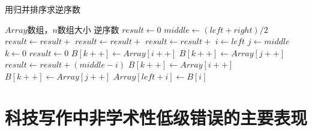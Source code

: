 \documentclass{cqupt_thesis}
\begin{document}
    \begin{algorithm}[H]

        \label{用归并排序求逆序数}
        \caption{用归并排序求逆序数}
        \begin{algorithmic}[1] %
            \Require $Array$数组，$n$数组大小
            \Ensure 逆序数
                \State $result \gets 0$
                    \State $middle \gets (left + right) / 2$
                    \State $result \gets result +$ 
                    \State $result \gets result +$ 
                    \State $result \gets result +$ 
                \EndIf
                \State {}
            \EndFunction
            \State
                \State $i\gets left$
                \State $j\gets middle$
                \State $k\gets 0$
                \State $result \gets 0$
                        \State $B[k++]\gets Array[i++]$
                    \Else
                        \State $B[k++] \gets Array[j++]$
                        \State $result \gets result + (middle - i)$
                    \EndIf
                \EndWhile
                    \State $B[k++] \gets Array[i++]$
                \EndWhile
                    \State $B[k++] \gets Array[j++]$
                \EndWhile
                    \State $Array[left + i] \gets B[i]$
                \EndFor
                \State {}
            \EndFunction
        \end{algorithmic}
    \end{algorithm}



    \begin{reference}
        
    \end{reference}


    \beginappendix


    \chapter{科技写作中非学术性低级错误的主要表现}
\end{document}
